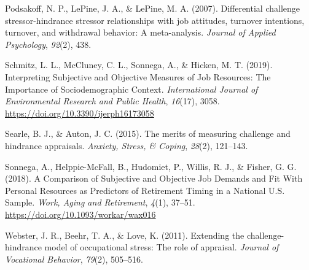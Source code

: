 \documentclass[
  english,
  man]{apa6}
\begin{document}
\leavevmode\hypertarget{ref-podsakoff2007differential}{}%
Podsakoff, N. P., LePine, J. A., \& LePine, M. A. (2007). Differential challenge stressor-hindrance stressor relationships with job attitudes, turnover intentions, turnover, and withdrawal behavior: A meta-analysis. \emph{Journal of Applied Psychology}, \emph{92}(2), 438.

\leavevmode\hypertarget{ref-schmitz_interpreting_2019}{}%
Schmitz, L. L., McCluney, C. L., Sonnega, A., \& Hicken, M. T. (2019). Interpreting Subjective and Objective Measures of Job Resources: The Importance of Sociodemographic Context. \emph{International Journal of Environmental Research and Public Health}, \emph{16}(17), 3058. \url{https://doi.org/10.3390/ijerph16173058}

\leavevmode\hypertarget{ref-searle2015merits}{}%
Searle, B. J., \& Auton, J. C. (2015). The merits of measuring challenge and hindrance appraisals. \emph{Anxiety, Stress, \& Coping}, \emph{28}(2), 121--143.

\leavevmode\hypertarget{ref-sonnega_comparison_2018}{}%
Sonnega, A., Helppie-McFall, B., Hudomiet, P., Willis, R. J., \& Fisher, G. G. (2018). A Comparison of Subjective and Objective Job Demands and Fit With Personal Resources as Predictors of Retirement Timing in a National U.S. Sample. \emph{Work, Aging and Retirement}, \emph{4}(1), 37--51. \url{https://doi.org/10.1093/workar/wax016}

\leavevmode\hypertarget{ref-webster2011extending}{}%
Webster, J. R., Beehr, T. A., \& Love, K. (2011). Extending the challenge-hindrance model of occupational stress: The role of appraisal. \emph{Journal of Vocational Behavior}, \emph{79}(2), 505--516.

\endgroup
\end{document}
